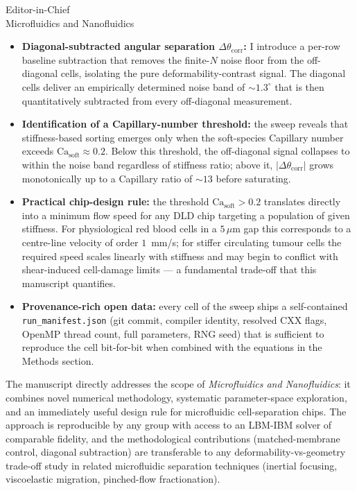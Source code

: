 \documentclass[11pt]{letter}
\begin{document}
\begin{letter}{
Editor-in-Chief\\
Microfluidics and Nanofluidics
}
\begin{itemize}
  \item \textbf{Diagonal-subtracted angular separation
        $\Delta\theta_{\text{corr}}$:} I introduce a per-row baseline
        subtraction that removes the finite-$N$ noise floor from the
        off-diagonal cells, isolating the pure deformability-contrast
        signal. The diagonal cells deliver an empirically determined
        noise band of $\sim 1.3^\circ$ that is then quantitatively
        subtracted from every off-diagonal measurement.

  \item \textbf{Identification of a Capillary-number threshold:} the
        sweep reveals that stiffness-based sorting emerges only when
        the soft-species Capillary number exceeds
        $\mathrm{Ca}_{\text{soft}} \approx 0.2$. Below this
        threshold, the off-diagonal signal collapses to within the
        noise band regardless of stiffness ratio; above it,
        $|\Delta\theta_{\text{corr}}|$ grows monotonically up to a
        Capillary ratio of $\sim 13$ before saturating.

  \item \textbf{Practical chip-design rule:} the threshold
        $\mathrm{Ca}_{\text{soft}} > 0.2$ translates directly into a
        minimum flow speed for any DLD chip targeting a population
        of given stiffness. For physiological red blood cells in a
        $5\,\mu$m gap this corresponds to a centre-line velocity of
        order $1$~mm/s; for stiffer circulating tumour cells the
        required speed scales linearly with stiffness and may begin
        to conflict with shear-induced cell-damage limits --- a
        fundamental trade-off that this manuscript quantifies.

  \item \textbf{Provenance-rich open data:} every cell of the sweep
        ships a self-contained \verb|run_manifest.json| (git commit,
        compiler identity, resolved CXX flags, OpenMP thread count,
        full parameters, RNG seed) that is sufficient to reproduce
        the cell bit-for-bit when combined with the equations in
        the Methods section.
\end{itemize}

The manuscript directly addresses the scope of
\textit{Microfluidics and Nanofluidics}: it combines novel
numerical methodology, systematic parameter-space exploration, and
an immediately useful design rule for microfluidic cell-separation
chips. The approach is reproducible by any group with access to an
LBM-IBM solver of comparable fidelity, and the methodological
contributions (matched-membrane control, diagonal subtraction) are
transferable to any deformability-vs-geometry trade-off study in
related microfluidic separation techniques (inertial focusing,
viscoelastic migration, pinched-flow fractionation).


\end{letter}
\end{document}
